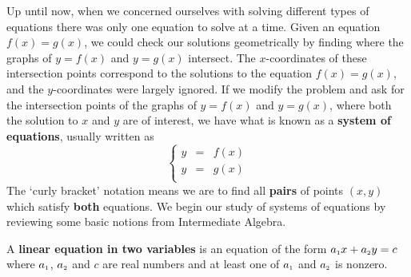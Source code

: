 

\setcounter{footnote}{0}

\label{LinSystems}

\setlength{\extrarowheight}{0pt}

Up until now, when we concerned ourselves with solving different types of equations there was only one equation to solve at a time.  Given an equation $f(x) = g(x)$, we could check our solutions geometrically by finding where the graphs of $y=f(x)$ and $y=g(x)$ intersect. The $x$-coordinates of these intersection points correspond to the solutions to the equation $f(x) = g(x)$, and the $y$-coordinates were largely ignored.  If we modify the problem and ask for the intersection points of the graphs of $y=f(x)$ and $y=g(x)$, where both the solution to $x$ and $y$ are of interest, we have what is known as a  \textbf{system of equations}, usually written as \[ \left\{ \begin{array}{rcl} y & = & f(x) \\ y & = & g(x) \\ \end{array} \right.\]  The `curly bracket' notation means we are  to find all \textbf{pairs} of points $(x,y)$ which satisfy \textbf{both} equations.  We begin our study of systems of equations by reviewing some basic notions from Intermediate Algebra.

\smallskip

\colorbox{ResultColor}{\bbm

\begin{defn}  \label{lineareqntwovariables}  A   \textbf{linear equation in two variables} is an equation of the form $a_{\mbox{\tiny$1$}} x + a_{\mbox{\tiny$2$}} y = c$ where $a_{\mbox{\tiny$1$}}$, $a_{\mbox{\tiny$2$}}$ and $c$ are real numbers and at least one of $a_{\mbox{\tiny$1$}}$ and $a_{\mbox{\tiny$2$}}$ is nonzero.

\end{defn}

\ebm}

\smallskip

